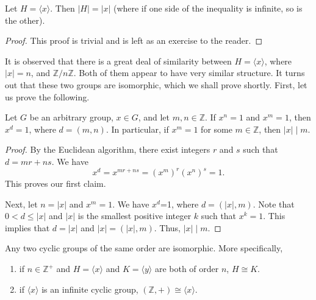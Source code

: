 \begin{theorem}
    Let $H=\langle x\rangle$. Then $|H|=|x|$ (where if one side of the inequality is infinite, so is the other).
\end{theorem}

\begin{proof}
    This proof is trivial and is left as an exercise to the reader.
\end{proof}

It is observed that there is a great deal of similarity between $H=\langle x\rangle$, where $|x|=n$, and $\mathbb{Z}/n\mathbb{Z}$. Both of them appear to have very similar structure. It turns out that these two groups are isomorphic, which we shall prove shortly. First, let us prove the following.

\begin{theorem}
    Let $G$ be an arbitrary group, $x\in G$, and let $m,n\in\mathbb{Z}$. If $x^n=1$ and $x^m=1$, then $x^d=1$, where $d=(m,n)$. In particular, if $x^m=1$ for some $m\in\mathbb{Z}$, then $|x|\mid m$.
\end{theorem}

\begin{proof}
    By the Euclidean algorithm, there exist integers $r$ and $s$ such that $d=mr+ns$. We have
    $$x^d=x^{mr+ns}=(x^m)^r(x^n)^s=1.$$
    This proves our first claim.
    
    Next, let $n=|x|$ and $x^m=1$. We have $x^d$=1, where $d=(|x|,m)$. Note that $0<d\leq |x|$ and $|x|$ is the smallest positive integer $k$ such that $x^k=1$. This implies that $d=|x|$ and $|x|=(|x|,m)$. Thus, $|x|\mid m$. 
\end{proof}

\begin{theorem}
    Any two cyclic groups of the same order are isomorphic. More specifically,
    \begin{enumerate}
        \item if $n\in\mathbb{Z}^+$ and $H=\langle x\rangle$ and $K=\langle y\rangle$ are both of order $n$, $H\cong K$.
        \item if $\langle x\rangle$ is an infinite cyclic group, $(\mathbb{Z},+)\cong\langle x\rangle$.
    \end{enumerate}
\end{theorem}

\clearpage